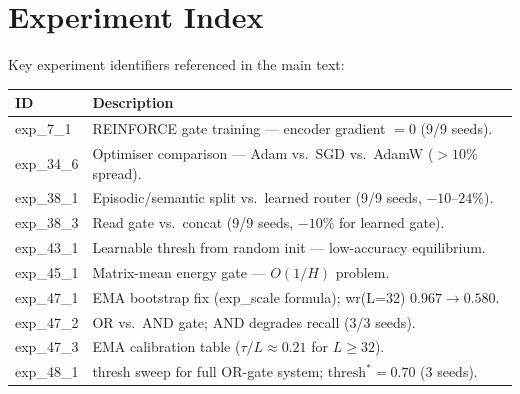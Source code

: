 \documentclass{article}
\begin{document}
\section{Experiment Index}
\label{app:experiments}

Key experiment identifiers referenced in the main text:

\begin{center}
\small
\begin{tabular}{lp{10cm}}
  \toprule
  \textbf{ID} & \textbf{Description} \\
  \midrule
  exp\_7\_1  & REINFORCE gate training — encoder gradient $= 0$ (9/9 seeds). \\
  exp\_34\_6 & Optimiser comparison — Adam vs.\ SGD vs.\ AdamW ($>10\%$ spread). \\
  exp\_38\_1 & Episodic/semantic split vs.\ learned router (9/9 seeds, $-10$--$24\%$). \\
  exp\_38\_3 & Read gate vs.\ concat (9/9 seeds, $-10\%$ for learned gate). \\
  exp\_43\_1 & Learnable thresh from random init — low-accuracy equilibrium. \\
  exp\_45\_1 & Matrix-mean energy gate — $O(1/H)$ problem. \\
  exp\_47\_1 & EMA bootstrap fix (exp\_scale formula); wr(L=32) $0.967 \to 0.580$. \\
  exp\_47\_2 & OR vs.\ AND gate; AND degrades recall (3/3 seeds). \\
  exp\_47\_3 & EMA calibration table ($\tau/L \approx 0.21$ for $L \geq 32$). \\
  exp\_48\_1 & thresh sweep for full OR-gate system; $\mathrm{thresh}^*=0.70$ (3 seeds). \\
  \bottomrule
\end{tabular}
\end{center}
\end{document}
